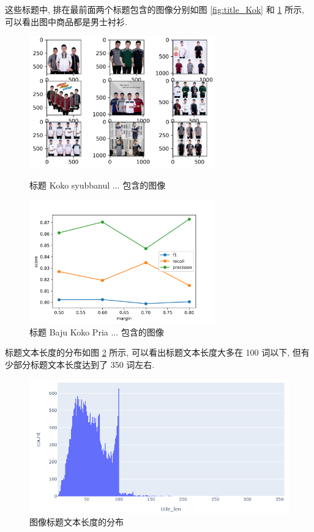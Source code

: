 \documentclass[12pt]{article}
\begin{document}
这些标题中, 排在最前面两个标题包含的图像分别如图 \ref{fig:title_Kok} 和 \ref{fig:title_Baj} 所示, 可以看出图中商品都是男士衬衫.

\begin{figure}[htbp]
  \centering
  \begin{minipage}[t]{0.48\textwidth}
    \centering
    \includegraphics[width=8cm]{title_Kok.jpg}
    \caption{标题 Koko syubbanul ... 包含的图像}
    \label{fig:title_Kok}
  \end{minipage}
  \begin{minipage}[t]{0.48\textwidth}
    \centering
    \includegraphics[width=8cm]{title_Baj.jpg}
    \caption{标题 Baju Koko Pria ... 包含的图像}
    \label{fig:title_Baj}
  \end{minipage}
\end{figure}

标题文本长度的分布如图 \ref{fig:dist_title_length} 所示, 可以看出标题文本长度大多在 100 词以下, 但有少部分标题文本长度达到了 350 词左右.

\begin{figure}[htbp]
  \centering
  \includegraphics[width=14cm]{dist_title_length.png}
  \caption{图像标题文本长度的分布}
  \label{fig:dist_title_length}
\end{figure}
\end{document}
